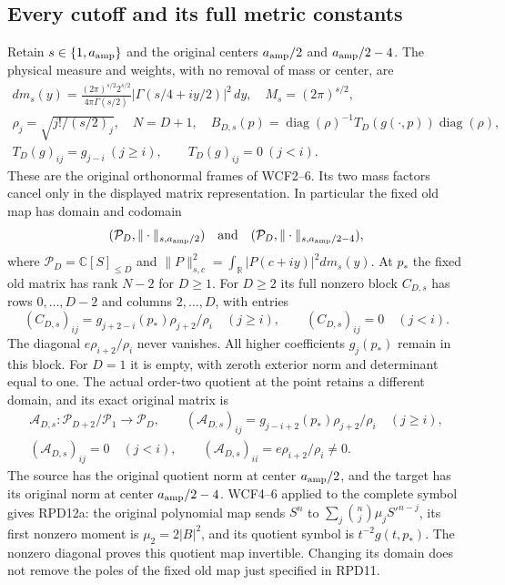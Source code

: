 \documentclass[11pt]{article}
\begin{document}
\subsection{Every cutoff and its full metric constants}

Retain $s\in\{1,a_{\rm amp}\}$ and the original centers
$a_{\rm amp}/2$ and $a_{\rm amp}/2-4$.  The physical measure and
weights, with no removal of mass or center, are
\[
 \begin{gathered}
 dm_s(y)=\frac{(2\pi)^{s/2}2^{s/2}}{4\pi\Gamma(s/2)}
       |\Gamma(s/4+iy/2)|^2\,dy,\quad M_s=(2\pi)^{s/2},\\
 \rho_j=\sqrt{j!/(s/2)_j},\quad N=D+1,\quad
 B_{D,s}(p)=\operatorname{diag}(\rho)^{-1}T_D(g(\cdot,p))
                                  \operatorname{diag}(\rho),\\
 T_D(g)_{ij}=g_{j-i}\ (j\ge i),\qquad T_D(g)_{ij}=0\ (j<i).
 \end{gathered}
 \tag{RPD11}
\]
These are the original orthonormal frames of WCF2--6.  Its two mass
factors cancel only in the displayed matrix representation.
In particular the fixed old map has domain and codomain
\[
(\mathcal P_D,\|\cdot\|_{s,a_{\rm amp}/2})\quad\text{and}\quad
(\mathcal P_D,\|\cdot\|_{s,a_{\rm amp}/2-4}),
\]
where
$\mathcal P_D=\mathbb C[S]_{\le D}$ and
$\|P\|_{s,c}^2=\int_{\mathbb R}|P(c+iy)|^2dm_s(y)$.
At $p_*$ the fixed old matrix has rank $N-2$ for $D\ge1$.
For $D\ge2$ its full nonzero block $C_{D,s}$ has rows $0,\ldots,D-2$
and columns $2,\ldots,D$, with entries
\[
 (C_{D,s})_{ij}=g_{j+2-i}(p_*)\rho_{j+2}/\rho_i\quad(j\ge i),
 \qquad (C_{D,s})_{ij}=0\quad(j<i).\tag{RPD12}
\]
The diagonal $e\rho_{i+2}/\rho_i$ never vanishes.  All higher
coefficients $g_j(p_*)$ remain in this block.  For $D=1$ it is empty,
with zeroth exterior norm and determinant equal to one.
The actual order-two quotient at the point retains a different
domain, and its exact original matrix is
\[
 \begin{gathered}
 \mathcal A_{D,s}:\mathcal P_{D+2}/\mathcal P_1\longrightarrow\mathcal P_D,
 \qquad (\mathcal A_{D,s})_{ij}=
       g_{j-i+2}(p_*)\rho_{j+2}/\rho_i\quad(j\ge i),\\
 (\mathcal A_{D,s})_{ij}=0\quad(j<i),\qquad
 (\mathcal A_{D,s})_{ii}=e\rho_{i+2}/\rho_i\ne0.
 \end{gathered}\tag{RPD12a}
\]
The source has the original quotient norm at center
$a_{\rm amp}/2$, and the target has its original norm at center
$a_{\rm amp}/2-4$.  WCF4--6 applied to the complete symbol gives
RPD12a: the original polynomial map sends
$S^n$ to $\sum_j\binom nj\mu_jS'^{n-j}$, its first nonzero moment
is $\mu_2=2|B|^2$, and its quotient symbol is $t^{-2}g(t,p_*)$.
The nonzero diagonal proves this quotient map invertible.  Changing
its domain does not remove the poles of the fixed old map just
specified in RPD11.
\end{document}
